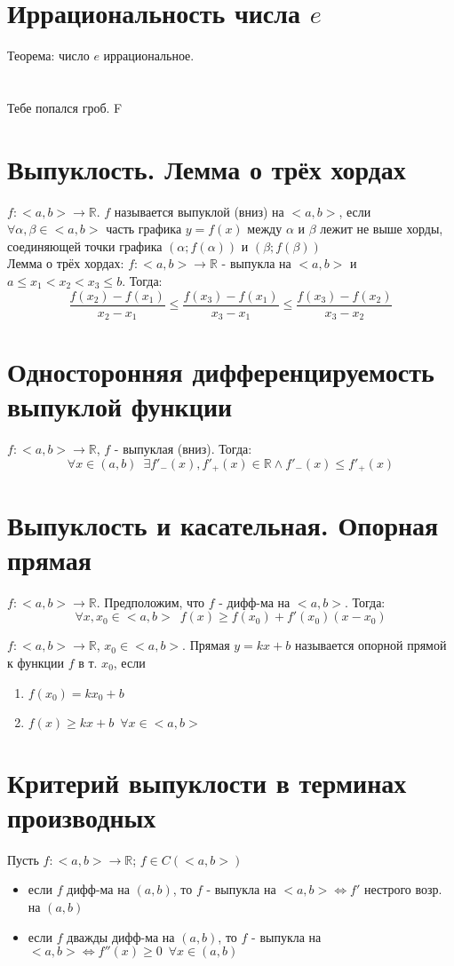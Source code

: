 \documentclass[11pt, a4paper, utf-8]{article}
\def\R{\mathbb{R}}
\def\sp{\, \, \,}
\begin{document}
    \section{Иррациональность числа $e$}
    Теорема: число $e$ иррациональное.

    \section{}
    Тебе попался гроб. F

    \section{Выпуклость. Лемма о трёх хордах}
    $f: <a,b> \to \R$. $f$ называется выпуклой (вниз) на $<a, b>$, если $\forall \alpha , \beta \in <a, b>$ часть графика $y = f(x)$ между $\alpha$ и $\beta$ лежит не выше хорды, соединяющей точки графика $(\alpha ; f(\alpha))$ и $(\beta ; f(\beta))$\\

    Лемма о трёх хордах: $f: <a, b> \to \R$ - выпукла на $<a, b>$ и $a \leq x_1 < x_2 < x_3 \leq b$. Тогда:
    $$\frac{f(x_2) - f(x_1)}{x_2 - x_1} \leq \frac{f(x_3) - f(x_1)}{x_3 - x_1} \leq \frac{f(x_3) - f(x_2)}{x_3 - x_2}$$
    
    \section{Односторонняя дифференцируемость выпуклой функции}
    $f: <a, b> \to \R$, $f$ - выпуклая (вниз). Тогда:
    $$\forall x \in (a,b) \sp \exists f'_-(x), f'_+(x) \in \R \land f'_-(x) \leq f'_+(x)$$

    \section{Выпуклость и касательная. Опорная прямая}
    $f: <a, b> \to \R$. Предположим, что $f$ - дифф-ма на $<a, b>$. Тогда:
    $$\forall x, x_0 \in <a, b> \sp f(x) \geq f(x_0) + f'(x_0)(x-x_0)$$

    $f: <a, b> \to \R$, $x_0 \in <a, b>$. Прямая $y=kx+b$ называется опорной прямой к функции $f$ в т. $x_0$, если
    \begin{enumerate}
        \item $f(x_0) = kx_0 + b$
        \item $f(x) \geq kx + b \sp \forall x \in <a,b>$
    \end{enumerate}

    \section{Критерий выпуклости в терминах производных}
    Пусть $f: <a,b> \to \R$; $f \in C(<a,b>)$
    \begin{itemize}
        \item если $f$ дифф-ма на $(a,b)$, то $f$ - выпукла на $<a, b> \iff f'$ нестрого возр. на $(a, b)$
        \item если $f$ дважды дифф-ма на $(a, b)$, то $f$ - выпукла на $<a, b> \iff f''(x) \geq 0 \sp \forall x \in (a,b)$
    \end{itemize}
\end{document}

